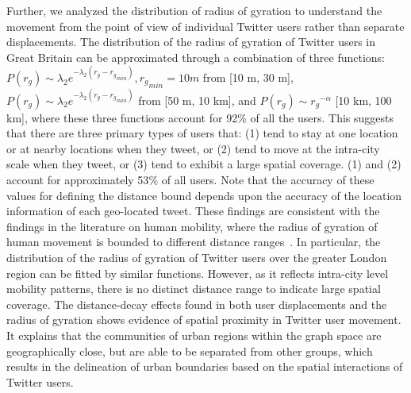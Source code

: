 \documentclass[]{tGIS2e}
\begin{document}
Further, we analyzed the distribution of radius of gyration to understand the movement from the point of view of individual Twitter users rather than separate displacements.
The distribution of the radius of gyration of Twitter users in Great Britain can be approximated through a combination of three functions: $P(r_{g}) \sim \lambda_{2} e^{-\lambda_{2}(r_{g} - {r_{g}}_{min})}, {r_{g}}_{min}= 10 m$ from [10 m, 30 m], $P(r_{g}) \sim \lambda_{2} e^{-\lambda_{2}(r_{g} - {r_{g}}_{min})}$ from [50 m, 10 km], and $P(r_{g}) \sim {r_{g}}^{-\alpha}$ [10 km, 100 km], where these three functions account for 92$\%$ of all the users.
This suggests that there are three primary types of users that: (1) tend to stay at one location or at nearby locations when they tweet, or (2) tend to move at the intra-city scale when they tweet, or (3)  tend to exhibit a large spatial coverage. 
(1) and (2) account for approximately 53$\%$ of all users.
Note that the accuracy of these values for defining the distance bound depends upon the accuracy of the location information of each geo-located tweet. 
These findings are consistent with the findings in the literature on human mobility, where the radius of gyration of human movement is bounded to different distance ranges~\citep{brockmann2006,gonzalez2008}.
In particular, the distribution of the radius of gyration of Twitter users over the greater London region can be fitted by similar functions.
However, as it reflects intra-city level mobility patterns, there is no distinct distance range to indicate large spatial coverage.
The distance-decay effects found in both user displacements and the radius of gyration shows evidence of spatial proximity in Twitter user movement. 
It explains that the communities of urban regions within the graph space are geographically close, but are able to be separated from other groups, which results in the delineation of urban boundaries based on the spatial interactions of Twitter users.
\end{document}
